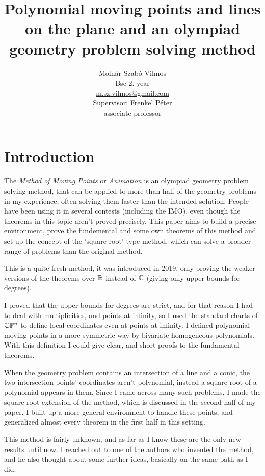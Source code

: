 \documentclass[a4paper]{article}
\title{\vspace*{10mm}\bf Polynomial moving points and lines on the plane and an olympiad geometry problem solving method} %
\author{Molnár-Szabó Vilmos\\ Bsc 2. year\\ \href{mailto:m.sz.vilmos@gmail.com}{m.sz.vilmos@gmail.com}\\ Supervisor: Frenkel Péter\\associate professor} %
\date{} %
\begin{document}
\maketitle



\section{Introduction}
The \textit{Method of Moving Points} or \textit{Animation} is an olympiad geometry problem solving method, that can be applied to more than half of the geometry problems in my experience, often solving them faster than the intended solution. People have been using it in several contests (including the IMO), even though the theorems in this topic aren't proved precisely. This paper aims to build a precise environment, prove the fundemental and some own theorems of this method and set up the concept of the 'square root' type method, which can solve a broader range of problems than the original method.


This is a quite fresh method, it was introduced in 2019, only proving the weaker versions of the theorems over $\mathbb{R}$ instead of $\mathbb{C}$ (giving only upper bounds for degrees).\cite{mmp}\cite{animation}



I proved that the upper bounds for degrees are strict, and for that reason I had to deal with multiplicities, and points at infinity, so I used the standard charts of $\mathbb{C}\mathbb{P}^n$ to define local coordinates even at points at infinity. I defined polynomial moving points in a more symmetric way by bivariate homogeneous polynomials. With this definition I could give clear, and short proofs to the fundamental theorems.

When the geometry problem contains an intersection of a line and a conic, the two intersection points' coordinates aren't polynomial, instead a square root of a polynomial appears in them. Since I came across many such problems, I made the square root extension of the method, which is discussed in the second half of my paper. I built up a more general environment to handle these points, and generalized almost every theorem in the first half in this setting.

This method is fairly unknown, and as far as I know these are the only new results until now. I reached out to one of the authors who invented the method, and he also thought about some further ideas, basically on the same path as I did.
\end{document}
